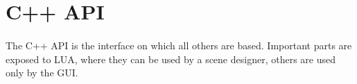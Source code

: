 \section{C++ API}
\paragraph{}
The C++ API is the interface on which all others are based.
Important parts are exposed to LUA, where they can be used by a scene designer, others are used only by the GUI.
